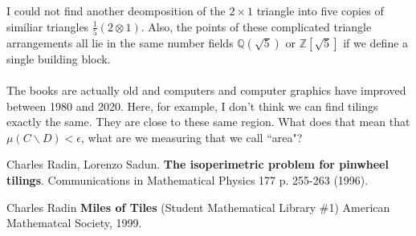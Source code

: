 \documentclass[12pt]{article}
\begin{document}
I could not find another deomposition of the $2 \times 1$ triangle into five copies of similiar triangles $\frac{1}{5}(2 \otimes 1)$.  Also, the points of these complicated triangle arrangements all lie in the same number fields $\mathbb{Q}(\sqrt{5})$ or $\mathbb{Z}[\sqrt{5}]$ if we define a single building block. \\ \\
The books are actually old and computers and computer graphics have improved between 1980 and 2020. Here, for example, I don't think we can find tilings exactly the same.  They are close to these same region.  What does that mean that $\mu(C \backslash D) < \epsilon$, what are we measuring that we call ``area"?

\vfill



\begin{thebibliography}{}

\item Charles Radin, Lorenzo Sadun.  \textbf{The isoperimetric problem for pinwheel tilings}. Communications in Mathematical Physics 177 p. 255-263 (1996).
\item Charles Radin \textbf{Miles of Tiles} (Student Mathematical Library \#1) American Mathematcal Society, 1999.
\end{thebibliography} 
\end{document}
